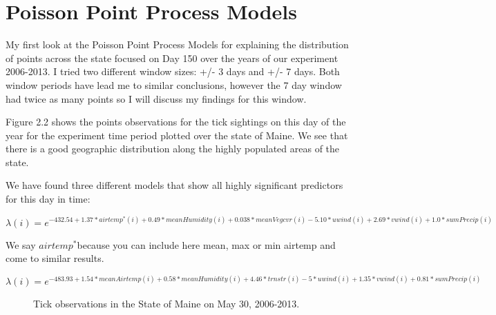 \section{Poisson Point Process Models }

\noindent My first look at the Poisson Point Process Models for explaining the distribution of points across the state focused on Day 150 over the years of our experiment 2006-2013. I tried two different window sizes: +/- 3 days and +/- 7 days. Both window periods have lead me to similar conclusions, however the 7 day window had twice as many points so I will discuss my findings for this window.\newline

\noindent Figure 2.2 shows the points observations for the tick sightings on this day of the year for the experiment time period plotted over the state of Maine. We see that there is a good geographic distribution along the highly populated areas of the state. \newline

\noindent We have found three different models that show all highly significant predictors for this day in time:

\begin{equation}
\lambda(i) = e^{-432.54 + 1.37*airtemp^*(i) + 0.49*meanHumidity(i) + 0.038*meanVegcvr(i) - 5.10*uwind(i) + 2.69*vwind(i) + 1.0*sumPrecip(i) }
\end{equation}

\noindent We say $airtemp^* $because you can include here mean, max or min airtemp and come to similar results.


\begin{equation}
\lambda(i) = e^{-483.93 + 1.54*meanAirtemp(i) + 0.58*meanHumidity(i) + 4.46*trnstr(i) - 5*uwind(i) + 1.35*vwind(i) + 0.81*sumPrecip(i) }
\end{equation}



\begin{figure} [t]
\centerline{}
\caption{Tick observations in the State of Maine on May 30, 2006-2013.}
\label{fig6}
\end{figure}

